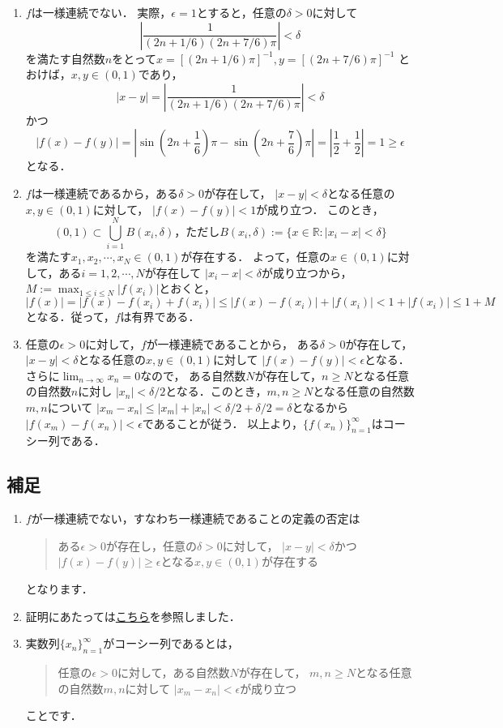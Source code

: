 \documentclass{jsarticle}
\theoremstyle{definition}
\begin{document}
\begin{enumerate}
\item$f$は一様連続でない．
実際，$\epsilon=1$とすると，任意の$\delta>0$に対して
\[ \left|\frac{1}{(2n+1/6)(2n+7/6)\pi}\right|<\delta \]
を満たす自然数$n$をとって$x=[(2n+1/6)\pi]^{-1},y=[(2n+7/6)\pi]^{-1}$
とおけば，$x,y\in(0,1)$であり，
\[ |x-y|=\left|\frac{1}{(2n+1/6)(2n+7/6)\pi}\right|<\delta \]
かつ
\[ |f(x)-f(y)|
=\left|\sin\left(2n+\frac{1}{6}\right)\pi-\sin\left(2n+\frac{7}{6}\right)\pi\right|
=\left|\frac{1}{2}+\frac{1}{2}\right|=1\geq\epsilon \]
となる．

\item$f$は一様連続であるから，ある$\delta>0$が存在して，
$|x-y|<\delta$となる任意の$x,y\in(0,1)$に対して，
$|f(x)-f(y)|<1$が成り立つ．
このとき，
\[ (0,1)\subset\bigcup_{i=1}^NB(x_i,\delta)，
ただし B(x_i,\delta):=\{x\in\mathbb{R}:|x_i-x|<\delta\} \]
を満たす$x_1,x_2,\cdots,x_N\in(0,1)$が存在する．
よって，任意の$x\in(0,1)$に対して，ある$i=1,2,\cdots,N$が存在して
$|x_i-x|<\delta$が成り立つから，$M:=\max_{1\leq i\leq N}|f(x_i)|$とおくと，
\[ |f(x)|=|f(x)-f(x_i)+f(x_i)|\leq|f(x)-f(x_i)|+|f(x_i)|<1+|f(x_i)|\leq1+M \]
となる．従って，$f$は有界である．

\item 任意の$\epsilon>0$に対して，$f$が一様連続であることから，
ある$\delta>0$が存在して，$|x-y|<\delta$となる任意の$x,y\in(0,1)$に対して
$|f(x)-f(y)|<\epsilon$となる．さらに$\lim_{n\to\infty}x_n=0$なので，
ある自然数$N$が存在して，$n\geq N$となる任意の自然数$n$に対し
$|x_n|<\delta/2$となる．このとき，$m,n\geq N$となる任意の自然数$m,n$について
$|x_m-x_n|\leq|x_m|+|x_n|<\delta/2+\delta/2=\delta$となるから
$|f(x_m)-f(x_n)|<\epsilon$であることが従う．
以上より，$\{f(x_n)\}_{n=1}^\infty$はコーシー列である．
\end{enumerate}

\subsection{補足}

\begin{enumerate}
\item$f$が一様連続でない，すなわち一様連続であることの定義の否定は
\begin{quote}
ある$\epsilon>0$が存在し，任意の$\delta>0$に対して，
$|x-y|<\delta$かつ$|f(x)-f(y)|\geq\epsilon$となる$x,y\in(0,1)$が存在する
\end{quote}
となります．

\item 証明にあたっては\href{https://math.stackexchange.com/questions/931887/how-to-prove-if-f-is-defined-and-uniformly-continuous-on-a-bounded-set-e-th}{こちら}を参照しました．

\item 実数列$\{x_n\}_{n=1}^\infty$がコーシー列であるとは，
\begin{quote}
任意の$\epsilon>0$に対して，ある自然数$N$が存在して，
$m,n\geq N$となる任意の自然数$m,n$に対して
$|x_m-x_n|<\epsilon$が成り立つ
\end{quote}
ことです．
\end{enumerate}
\end{document}

